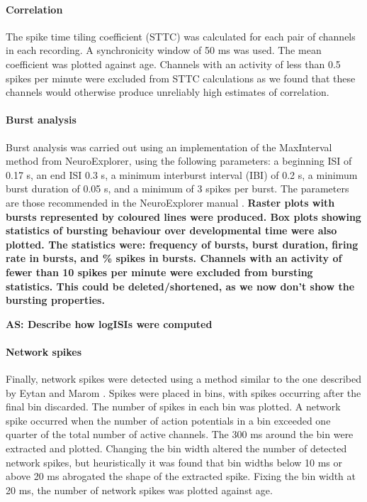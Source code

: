 \documentclass[doublespacing]{bmcart}
\begin{document}
\paragraph{Correlation} The spike time tiling coefficient (STTC) \cite{Cutts2014} was calculated for each pair of channels in each recording. A synchronicity window of 50 ms was used. The mean coefficient was plotted against age. Channels with an activity of less than 0.5 spikes per minute were excluded from STTC calculations as we found that these channels would otherwise produce unreliably high estimates of correlation.

\paragraph{Burst analysis} Burst analysis was carried out using an implementation of the MaxInterval method from NeuroExplorer, using the following parameters: a beginning ISI of 0.17 s, an end ISI 0.3 s, a minimum interburst interval (IBI) of 0.2 s, a minimum burst duration of 0.05 s, and a minimum of 3 spikes per burst. The parameters are those recommended in the NeuroExplorer manual \cite{neuroexplorer2020}. \textbf{Raster plots with bursts represented by coloured lines were produced. Box plots showing statistics of bursting behaviour over developmental time were also plotted. The statistics were: frequency of bursts, burst duration, firing rate in bursts, and \% spikes in bursts. Channels with an activity of fewer than 10 spikes per minute were excluded from bursting statistics.  This could be deleted/shortened, as we now don't show the bursting properties.}

\textbf{AS: Describe how logISIs were computed}

\paragraph{Network spikes} Finally, network spikes were detected using a method similar to the one described by Eytan and Marom \cite{Eytan2006}. Spikes were placed in bins, with spikes occurring after the final bin discarded. The number of spikes in each bin was plotted. A network spike occurred when the number of action potentials in a bin exceeded one quarter of the total number of active channels. The 300 ms around the bin were extracted and plotted. Changing the bin width altered the number of detected network spikes, but heuristically it was found that bin widths below 10 ms or above 20 ms abrogated the shape of the extracted spike. Fixing the bin width at 20 ms, the number of network spikes was plotted against age.
\end{document}
